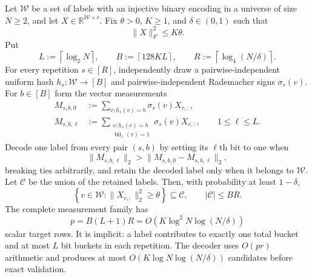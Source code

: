 \begin{theorem}
\label{thm:coded-bucket-row-locator}
Let $\mathcal W$ be a set of labels with an injective binary encoding in a
universe of size $N\geq2$, and let
$X\in\mathbb R^{\mathcal W\times r}$.  Fix $\theta>0$, $K\geq1$, and
$\delta\in(0,1)$ such that
\begin{equation}
 \|X\|_F^2\leq K\theta.
 \label{eq:coded-locator-mass-cap}
\end{equation}
Put
\begin{equation*}
 L:=\left\lceil\log_2N\right\rceil,
 \qquad
 B:=\left\lceil128KL\right\rceil,
 \qquad
 R:=\left\lceil\log_4(N/\delta)\right\rceil.
\end{equation*}
For every repetition $s\in[R]$, independently draw a pairwise-independent
uniform hash $h_s:\mathcal W\to[B]$ and pairwise-independent Rademacher
signs $\sigma_s(v)$.  For $b\in[B]$ form the vector measurements
\begin{align}
 M_{s,b,0}
 &:=\sum_{v:h_s(v)=b}\sigma_s(v)X_{v,:},
 \label{eq:coded-locator-total-bucket}\\
 M_{s,b,\ell}
 &:=\sum_{\substack{v:h_s(v)=b\\
              \operatorname{bit}_\ell(v)=1}}
       \sigma_s(v)X_{v,:},
 \qquad 1\leq\ell\leq L.
 \label{eq:coded-locator-bit-bucket}
\end{align}
Decode one label from every pair $(s,b)$ by setting its $\ell$th bit to one
when
\begin{equation}
 \|M_{s,b,\ell}\|_2>
 \|M_{s,b,0}-M_{s,b,\ell}\|_2,
 \label{eq:coded-locator-bit-test}
\end{equation}
breaking ties arbitrarily, and retain the decoded label only when it belongs
to $\mathcal W$.  Let $\mathcal C$ be the union of the retained labels.  Then,
with probability at least $1-\delta$,
\begin{equation}
 \left\{v\in\mathcal W:\|X_{v,:}\|_2^2\geq\theta\right\}
 \subseteq\mathcal C,
 \qquad
 |\mathcal C|\leq BR.
 \label{eq:coded-locator-output}
\end{equation}
The complete measurement family has
\begin{equation}
 p=B(L+1)R
 =O\!\left(K\log^2N\log(N/\delta)\right)
 \label{eq:coded-locator-row-count}
\end{equation}
scalar target rows.  It is implicit: a label contributes to exactly one total
bucket and at most $L$ bit buckets in each repetition.  The decoder uses
$O(pr)$ arithmetic and produces at most
$O(K\log N\log(N/\delta))$ candidates before exact validation.
\end{theorem}

